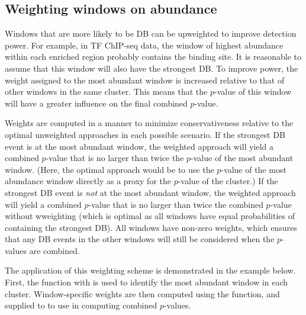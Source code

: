 \documentclass{report}\usepackage[]{graphicx}\usepackage[usenames,dvipsnames]{color}
\begin{document}
\subsection{Weighting windows on abundance}
Windows that are more likely to be DB can be upweighted to improve detection power.
For example, in TF ChIP-seq data, the window of highest abundance within each enriched region probably contains the binding site.
It is reasonable to assume that this window will also have the strongest DB.
To improve power, the weight assigned to the most abundant window is increased relative to that of other windows in the same cluster.
This means that the $p$-value of this window will have a greater influence on the final combined $p$-value.

Weights are computed in a manner to minimize conservativeness relative to the optimal unweighted approaches in each possible scenario. 
If the strongest DB event is at the most abundant window, the weighted approach will yield a combined $p$-value that is no larger than twice the $p$-value of the most abundant window.
(Here, the optimal approach would be to use the $p$-value of the most abundance window directly as a proxy for the $p$-value of the cluster.)
If the strongest DB event is \emph{not} at the most abundant window, the weighted approach will yield a combined $p$-value that is no larger than twice the combined $p$-value without wweighting (which is optimal as all windows have equal probabilities of containing the strongest DB).
All windows have non-zero weights, which ensures that any DB events in the other windows will still be considered when the $p$-values are combined.

The application of this weighting scheme is demonstrated in the example below.
First, the  function with  is used to identify the most abundant window in each cluster.
Window-specific weights are then computed using the  function, and supplied to  to use in computing combined $p$-values.
\end{document}
